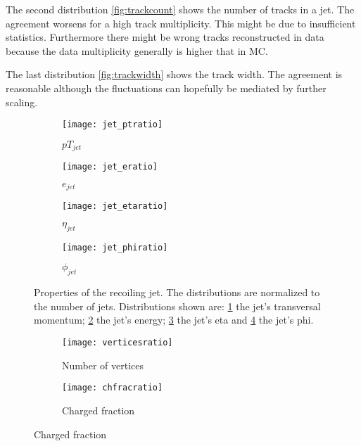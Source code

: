 The second distribution \ref{fig:trackcount} shows the number of tracks in a jet. The agreement worsens for a high track multiplicity. This might be due to insufficient statistics. Furthermore there might be wrong tracks reconstructed in data because the data multiplicity generally is higher that in MC.

The last distribution \ref{fig:trackwidth} shows the track width. The agreement is reasonable although the fluctuations can hopefully be mediated by further scaling.



\begin{figure}[h]
\centering
\begin{subfigure}[b]{0.5\figwidth}
\texttt{[image: jet\_ptratio]}
\caption[Transversal momentum of the recoiling jet]{$pT_{jet}$}
\label{fig:jetpt}
\end{subfigure}
\quad
\begin{subfigure}[b]{0.5\figwidth}
\texttt{[image: jet\_eratio]}
\caption[Energy of the recoiling jet]{$e_{jet}$}
\label{fig:jete}
\end{subfigure}


\begin{subfigure}[b]{0.5\figwidth}
\texttt{[image: jet\_etaratio]}
\caption[$\eta$ of the recoiling jet]{$\eta_{jet}$}
\label{fig:jeteta}
\end{subfigure}
\quad
\begin{subfigure}[b]{0.5\figwidth}
\texttt{[image: jet\_phiratio]}
\caption[$\phi$ of the recoiling jet]{$\phi_{jet}$}
\label{fig:jetphi}
\end{subfigure}
\caption{Properties of the recoiling jet. The distributions are normalized to the number of jets. Distributions shown are: \ref{fig:jetpt} the jet's transversal momentum; \ref{fig:jete} the jet's energy; \ref{fig:jeteta} the jet's eta and \ref{fig:jetphi} the jet's phi.}
\label{fig:reoilingjet}
\end{figure}




\begin{figure}[h]
\centering
\begin{subfigure}[b]{0.5\figwidth}
\texttt{[image: verticesratio]}
\caption[Number of vertices]{Number of vertices}
\label{fig:vertices}
\end{subfigure}
\quad
\begin{subfigure}[b]{0.5\figwidth}
\texttt{[image: chfracratio]}
\caption[Charged fraction]{Charged fraction}
\label{fig:chfrac}
\end{subfigure}
\end{figure}



